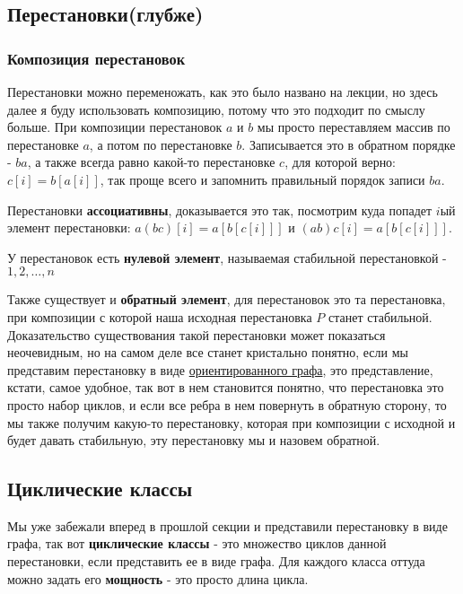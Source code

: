 
\subsection{Перестановки(глубже)}
\subsubsection{Композиция перестановок}
Перестановки можно переменожать, как это было названо на лекции, но здесь далее я буду использовать композицию, потому что это подходит по смыслу больше. При композиции перестановок $a$ и $b$ мы просто переставляем массив по перестановке $a$, а потом по перестановке $b$. Записывается это в обратном порядке - $ba$, а также всегда равно какой-то перестановке $c$, для которой верно: $c[i] = b[a[i]]$, так проще всего и запомнить правильный порядок записи $ba$.

Перестановки \textbf{ассоциативны}, доказывается это так, посмотрим куда попадет $i$ый элемент перестановки: $a(bc)[i]=a[b[c[i]]]$ и $(ab)c[i] = a[b[c[i]]]$.

У перестановок есть \textbf{нулевой элемент}, называемая стабильной перестановкой -  $1, 2, \dots, n$

Также существует и \textbf{обратный элемент}, для перестановок это та перестановка, при композиции с которой наша исходная перестановка $P$ станет стабильной. Доказательство существования такой перестановки может показаться неочевидным, но на самом деле все станет кристально понятно, если мы представим перестановку в виде \href{https://ru.wikipedia.org/wiki/%D0%9E%D1%80%D0%B8%D0%B5%D0%BD%D1%82%D0%B8%D1%80%D0%BE%D0%B2%D0%B0%D0%BD%D0%BD%D1%8B%D0%B9_%D0%B3%D1%80%D0%B0%D1%84}{ориентированного графа}, это представление, кстати, самое удобное, так вот в нем становится понятно, что перестановка это просто набор циклов, и если все ребра в нем повернуть в обратную сторону, то мы также получим какую-то перестановку, которая при композиции с исходной и будет давать стабильную, эту перестановку мы и назовем обратной.

\subsection{Циклические классы}
Мы уже забежали вперед в прошлой секции и представили перестановку в виде графа, так вот \textbf{циклические классы} - это множество циклов данной перестановки, если представить ее в виде графа. Для каждого класса оттуда можно задать его \textbf{мощность} - это просто длина цикла.

